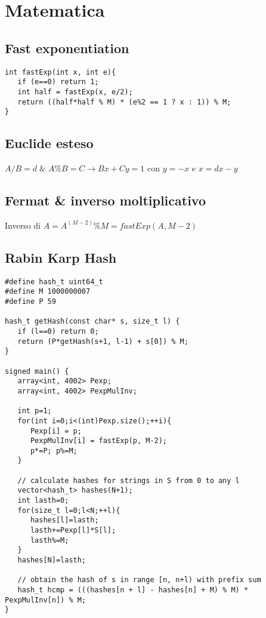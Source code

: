 \section{Matematica}

\subsection{Fast exponentiation}
\begin{lstlisting}
int fastExp(int x, int e){
   if (e==0) return 1;
   int half = fastExp(x, e/2);
   return ((half*half % M) * (e%2 == 1 ? x : 1)) % M;
}
\end{lstlisting}

\subsection{Euclide esteso}
$A/B=d\; \& \;A\%B=C \rightarrow Bx+Cy = 1$ con $y=-x$ e $x = dx - y$

\subsection{Fermat \& inverso moltiplicativo}
Inverso di $A = A^{(M-2)}\%M = fastExp(A, M-2)$

\subsection{Rabin Karp Hash}
\begin{lstlisting}
#define hash_t uint64_t
#define M 1000000007
#define P 59

hash_t getHash(const char* s, size_t l) {
   if (l==0) return 0;
   return (P*getHash(s+1, l-1) + s[0]) % M;
}

signed main() {
   array<int, 4002> Pexp;
   array<int, 4002> PexpMulInv;

   int p=1;
   for(int i=0;i<(int)Pexp.size();++i){
      Pexp[i] = p;
      PexpMulInv[i] = fastExp(p, M-2);
      p*=P; p%=M;
   }
   
   // calculate hashes for strings in S from 0 to any l
   vector<hash_t> hashes(N+1);
   int lasth=0;
   for(size_t l=0;l<N;++l){
      hashes[l]=lasth;
      lasth+=Pexp[l]*S[l];
      lasth%=M;
   }
   hashes[N]=lasth;

   // obtain the hash of s in range [n, n+l) with prefix sum
   hash_t hcmp = (((hashes[n + l] - hashes[n] + M) % M) * PexpMulInv[n]) % M;
}
\end{lstlisting}
